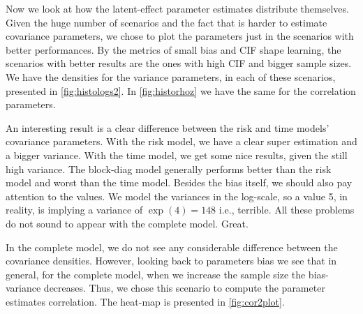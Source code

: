 Now we look at how the latent-effect parameter estimates distribute
themselves. Given the huge number of scenarios and the fact that is
harder to estimate covariance parameters, we chose to plot the
parameters just in the scenarios with better performances. By the
metrics of small bias and CIF shape learning, the scenarios with better
results are the ones with high CIF and bigger sample sizes. We have the
densities for the variance parameters, in each of these scenarios,
presented in \autoref{fig:histologs2}. In \autoref{fig:historhoz} we
have the same for the correlation parameters.

An interesting result is a clear difference between the risk and time
models' covariance parameters. With the risk model, we have a clear
super estimation and a bigger variance. With the time model, we get some
nice results, given the still high variance. The block-diag model
generally performs better than the risk model and worst than the time
model. Besides the bias itself, we should also pay attention to the
values. We model the variances in the log-scale, so a value 5, in
reality, is implying a variance of \(\exp(4) = 148\) i.e., terrible. All
these problems do not sound to appear with the complete model. Great.

In the complete model, we do not see any considerable difference between
the covariance densities. However, looking back to parameters bias we
see that in general, for the complete model, when we increase the sample
size the bias-variance decreases. Thus, we chose this scenario to
compute the parameter estimates correlation. The heat-map is presented
in \autoref{fig:cor2plot}.

